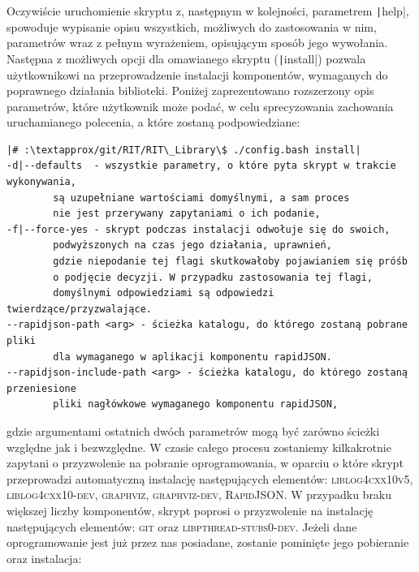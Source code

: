 Oczywiście uruchomienie skryptu z, następnym w kolejności, parametrem \texttt|help|, spowoduje wypisanie opisu wszystkich, możliwych do zastosowania w nim, parametrów wraz z pełnym wyrażeniem, opisującym sposób jego wywołania. Następna z możliwych opcji dla omawianego skryptu (\texttt|install|) pozwala użytkownikowi na przeprowadzenie instalacji komponentów, wymaganych do poprawnego działania biblioteki. Poniżej zaprezentowano rozszerzony opis parametrów, które użytkownik może podać, w celu sprecyzowania zachowania uruchamianego polecenia, a które zostaną podpowiedziane:
\begin{verbatim}
|# :\textapprox/git/RIT/RIT\_Library\$ ./config.bash install|
-d|--defaults  - wszystkie parametry, o które pyta skrypt w trakcie wykonywania, 
		są uzupełniane wartościami domyślnymi, a sam proces 
		nie jest przerywany zapytaniami o ich podanie,
-f|--force-yes - skrypt podczas instalacji odwołuje się do swoich, 
		podwyższonych na czas jego działania, uprawnień, 
		gdzie niepodanie tej flagi skutkowałoby pojawianiem się próśb 
		o podjęcie decyzji. W przypadku zastosowania tej flagi, 
		domyślnymi odpowiedziami są odpowiedzi twierdzące/przyzwalające.
--rapidjson-path <arg> - ścieżka katalogu, do którego zostaną pobrane pliki 
		dla wymaganego w aplikacji komponentu rapidJSON.
--rapidjson-include-path <arg> - ścieżka katalogu, do którego zostaną przeniesione 
		pliki nagłówkowe wymaganego komponentu rapidJSON,
\end{verbatim}
gdzie argumentami ostatnich dwóch parametrów mogą być zarówno ścieżki względne jak i bezwzględne. W czasie całego procesu zostaniemy kilkakrotnie zapytani o przyzwolenie na pobranie oprogramowania, w oparciu o które skrypt przeprowadzi automatyczną  instalację następujących elementów: \textsc{liblog4cxx10v5}, \textsc{liblog4cxx10-dev}, \textsc{graphviz}, \textsc{graphviz-dev}, \textsc{RapidJSON}. W przypadku braku większej liczby komponentów, skrypt poprosi o przyzwolenie na instalację następujących elementów: \textsc{git} oraz \textsc{libpthread-stubs0-dev}. Jeżeli dane oprogramowanie jest już przez nas posiadane, zostanie pominięte jego pobieranie oraz instalacja:


